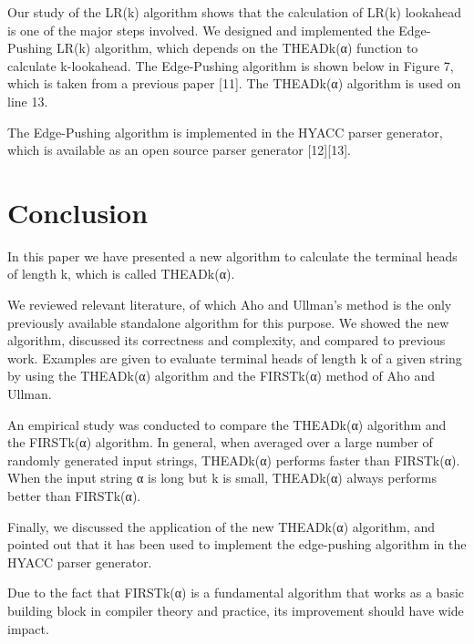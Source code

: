 \documentclass{sig-alternate-05-2015}
\begin{document}
Our study of the LR(k) algorithm shows that the calculation
of LR(k) lookahead is one of the major steps involved.
We designed and implemented the Edge-Pushing LR(k)
algorithm, which depends on the THEADk(α) function to
calculate k-lookahead. The Edge-Pushing algorithm is
shown below in Figure 7, which is taken from a previous
paper [11]. The THEADk(α) algorithm is used on line 13.

The Edge-Pushing algorithm is implemented in the
HYACC parser generator, which is available as an open
source parser generator [12][13].

\section{Conclusion}
In this paper we have presented a new algorithm to calculate
the terminal heads of length k, which is called
THEADk(α).

We reviewed relevant literature, of which Aho and
Ullman’s method is the only previously available
standalone algorithm for this purpose.
We showed the new algorithm, discussed its correctness
and complexity, and compared to previous work. Examples
are given to evaluate terminal heads of length k of a given
string by using the THEADk(α) algorithm and the
FIRSTk(α) method of Aho and Ullman.

An empirical study was conducted to compare the
THEADk(α) algorithm and the FIRSTk(α) algorithm. In
general, when averaged over a large number of randomly
generated input strings, THEADk(α) performs faster than
FIRSTk(α). When the input string α is long but k is small,
THEADk(α) always performs better than FIRSTk(α).

Finally, we discussed the application of the new
THEADk(α) algorithm, and pointed out that it has been
used to implement the edge-pushing algorithm in the HYACC
parser generator.

Due to the fact that FIRSTk(α) is a fundamental algorithm
that works as a basic building block in compiler theory
and practice, its improvement should have wide impact.


%

%
%
\end{document}
